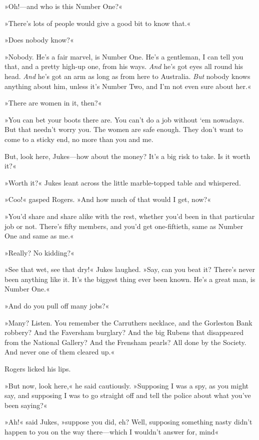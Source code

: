 »Oh!—and who is this Number One?«

»There's lots of people would give a good bit to know that.«

»Does nobody know?«

»Nobody. He's a fair marvel, is Number One. He's a gentleman, I can tell you that, and a pretty high-up one, from his ways. \textit{And} he's got eyes all round his head. \textit{And} he's got an arm as long as from here to Australia. \textit{But} nobody knows anything about him, unless it's Number Two, and I'm not even sure about her.«

»There are women in it, then?«

»You can bet your boots there are. You can't do a job without `em nowadays. But that needn't worry you. The women are safe enough. They don't want to come to a sticky end, no more than you and me.

But, look here, Jukes—how about the money? It's a big risk to take. Is it worth it?«

»Worth it?« Jukes leant across the little marble-topped table and whispered.

»Coo!« gasped Rogers. »And how much of that would I get, now?«

»You'd share and share alike with the rest, whether you'd been in that particular job or not. There's fifty members, and you'd get one-fiftieth, same as Number One and same as me.«

»Really? No kidding?«

»See that wet, see that dry!« Jukes laughed. »Say, can you beat it? There's never been anything like it. It's the biggest thing ever been known. He's a great man, is Number One.«

»And do you pull off many jobs?«

»Many? Listen. You remember the Carruthers necklace, and the Gorleston Bank robbery? And the Faversham burglary? And the big Rubens that disappeared from the National Gallery? And the Frensham pearls? All done by the Society. And never one of them cleared up.«

Rogers licked his lips.

»But now, look here,« he said cautiously. »Supposing I was a spy, as you might say, and supposing I was to go straight off and tell the police about what you've been saying?«

»Ah!« said Jukes, »suppose you did, eh? Well, supposing something nasty didn't happen to you on the way there—which I wouldn't answer for, mind\longdash«

